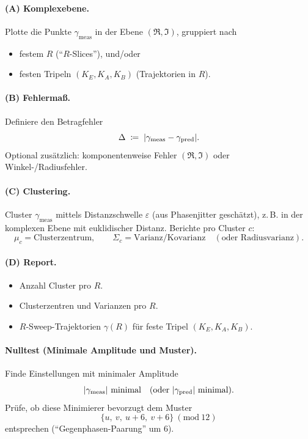 \documentclass[11pt,a4paper]{article}
\newcommand{\modtwelve}{\ (\mathrm{mod}\ 12)}
\begin{document}
	\paragraph{(A) Komplexebene.}
	Plotte die Punkte $\gamma_{\mathrm{meas}}$ in der Ebene $(\Re,\Im)$, gruppiert nach
	\begin{itemize}
		\item festem $R$ (``$R$-Slices''), und/oder
		\item festen Tripeln $(K_E,K_A,K_B)$ (Trajektorien in $R$).
	\end{itemize}
	
	\paragraph{(B) Fehlermaß.}
	Definiere den Betragfehler
	\[
	\Delta \;\coloneqq\; \abs{\gamma_{\mathrm{meas}} - \gamma_{\mathrm{pred}}}.
	\]
	Optional zusätzlich: komponentenweise Fehler $(\Re,\Im)$ oder Winkel-/Radiusfehler.
	
	\paragraph{(C) Clustering.}
	Cluster $\gamma_{\mathrm{meas}}$ mittels Distanzschwelle $\varepsilon$ (aus Phasenjitter geschätzt),
	z.\,B. in der komplexen Ebene mit euklidischer Distanz.
	Berichte pro Cluster $c$:
	\[
	\mu_c = \text{Clusterzentrum},\qquad
	\Sigma_c = \text{Varianz/Kovarianz} \quad (\text{oder Radiusvarianz}).
	\]
	
	\paragraph{(D) Report.}
	\begin{itemize}
		\item Anzahl Cluster pro $R$.
		\item Clusterzentren und Varianzen pro $R$.
		\item $R$-Sweep-Trajektorien $\gamma(R)$ für feste Tripel $(K_E,K_A,K_B)$.
	\end{itemize}
	
	\paragraph{Nulltest (Minimale Amplitude und Muster).}
	Finde Einstellungen mit minimaler Amplitude
	\[
	\abs{\gamma_{\mathrm{meas}}}\ \text{minimal} \quad \text{(oder }\abs{\gamma_{\mathrm{pred}}}\text{ minimal).}
	\]
	Prüfe, ob diese Minimierer bevorzugt dem Muster
	\[
	\{u,\ v,\ u+6,\ v+6\}\modtwelve
	\]
	entsprechen (``Gegenphasen-Paarung'' um $6$).
	
\end{document}
